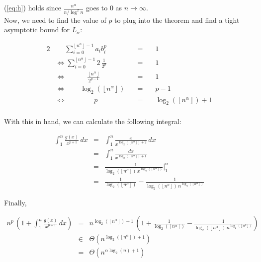 \documentclass[a4paper,10pt]{article}
\newcommand{\floor}[1]{\ensuremath{\left\lfloor #1 \right\rfloor}}
\begin{document}
(\ref{eq:h}) holds since $\frac{n^{\alpha}}{n / \log^2{n}}$ goes to $0$ as $n \rightarrow  \infty$.\\

Now, we need to find the value of $p$ to plug into the theorem and find a tight asymptotic bound for $L_{\alpha}$:

\begin{alignat*}{2}
    &\quad \,\, \displaystyle \sum_{i = 0}^{\floor{n^{\alpha}} - 1}{a_i b_i^p} \quad &= & \quad 1 \\ 
    &\Leftrightarrow \displaystyle \sum_{i = 0}^{\floor{n^{\alpha}} - 1}{2 \, \frac{1}{2^p}} \quad &=& \quad 1 \\
    &\Leftrightarrow  \quad\quad\quad \frac{\floor{n^{\alpha}}}{2^{p-1}}\quad &=& \quad 1 \\
    &\Leftrightarrow  \quad\quad \log_2\left(\floor{n^{\alpha}}\right) \quad &=& \quad p - 1 \\
    &\Leftrightarrow  \quad\quad\quad\quad p \quad &=& \quad \log_2\left(\floor{n^{\alpha}}\right) + 1 \\
\end{alignat*}

With this in hand, we can calculate the following integral:

\begin{eqnarray*}
    \int_{1}^{n}{\frac{g(x)}{x^{p+1}} \, dx} &=& \int_{1}^{n}{\frac{x}{x^{\log_2\left(\floor{n^{\alpha}}\right) + 2}} \, dx} \\
    &=& \int_{1}^{n}{\frac{dx}{x^{\log_2\left(\floor{n^{\alpha}}\right) + 1}}} \\
    &=& \frac{-1}{\log_2\left(\floor{n^{\alpha}}\right) \, x^{\log_2\left(\floor{n^{\alpha}}\right)}} \bigg\rvert_{1}^{n} \\
    &=& \frac{1}{\log_2\left(\floor{n^{\alpha}}\right)} - \frac{1}{\log_2\left(\floor{n^{\alpha}}\right) \, n^{\log_2\left(\floor{n^{\alpha}}\right)}}
\end{eqnarray*}

Finally,

\begin{eqnarray*}
    n^p \, \left(1 + \int_{1}^{n}{\frac{g(x)}{x^{p+1}} \, dx}\right) &=& n^{\log_2\left(\floor{n^{\alpha}}\right) + 1} \,
                                                                         \left(1 + \frac{1}{\log_2\left(\floor{n^{\alpha}}\right)}
                                                                         - \frac{1}{\log_2\left(\floor{n^{\alpha}}\right) \, n^{\log_2\left(\floor{n^{\alpha}}\right)}}
                                                                         \right) \\
    &\in& \Theta \left(n^{\log_2\left(\floor{n^{\alpha}}\right) + 1}\right) \\
    &=& \Theta \left(n^{\alpha \log_2(n) + 1} \right)
\end{eqnarray*}
\end{document}
